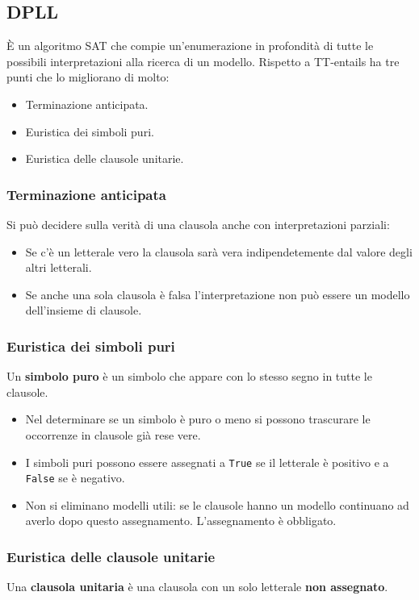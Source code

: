 \subsection{DPLL}
\`E un algoritmo SAT che compie un'enumerazione in profondit\`a di tutte le possibili interpretazioni alla ricerca
di un modello.
Rispetto a TT-entails ha tre punti che lo migliorano di molto:
\begin{itemize}
	\item Terminazione anticipata.
	\item Euristica dei simboli puri.
	\item Euristica delle clausole unitarie.
\end{itemize}

\subsubsection{Terminazione anticipata}
Si pu\`o decidere sulla verit\`a di una clausola anche con interpretazioni parziali:
\begin{itemize}
	\item Se c'\`e un letterale vero la clausola sar\`a vera indipendetemente dal valore degli altri letterali.
	\item Se anche una sola clausola \`e falsa l'interpretazione non pu\`o essere un modello dell'insieme di clausole.
\end{itemize}

\subsubsection{Euristica dei simboli puri}
Un \textbf{simbolo puro} \`e un simbolo che appare con lo stesso segno in tutte le clausole.
\begin{itemize}
	\item Nel determinare se un simbolo \`e puro o meno si possono trascurare le occorrenze in clausole gi\`a rese vere.
	\item I simboli puri possono essere assegnati a \verb|True| se il letterale \`e positivo e a \verb|False| se \`e negativo.
	\item Non si eliminano modelli utili: se le clausole hanno un modello continuano ad averlo dopo questo assegnamento.
	      L'assegnamento \`e obbligato.
\end{itemize}

\subsubsection{Euristica delle clausole unitarie}
Una \textbf{clausola unitaria} \`e una clausola con un solo letterale \textbf{non assegnato}.

